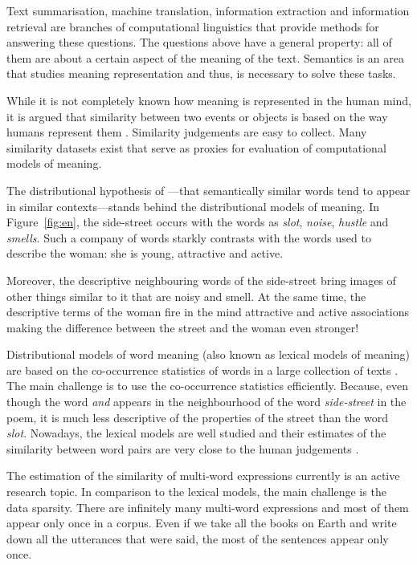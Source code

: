 Text summarisation, machine translation, information extraction and information retrieval are branches of computational linguistics that provide methods for answering these questions. The questions above have a general property: all of them are about a certain aspect of the meaning of the text. Semantics is an area that studies meaning representation and thus, is necessary to solve these tasks.

While it is not completely known how meaning is represented in the human mind, it is argued that similarity between two events or objects is based on the way humans represent them \cite{WCS:WCS1282}. Similarity judgements are easy to collect. Many similarity datasets exist that serve as proxies for evaluation of computational models of meaning.

The distributional hypothesis of \citet{harris1954distributional}---that semantically similar words tend to appear in similar contexts---stands behind the distributional models of meaning. In Figure~\ref{fig:en}, the side-street occurs with the words as \textit{slot}, \textit{noise}, \textit{hustle} and \textit{smells}. Such a company of words starkly contrasts with the words used to describe the woman: she is young, attractive and active.

Moreover, the descriptive neighbouring words of the side-street bring images of other things similar to it that are noisy and smell. At the same time, the descriptive terms of the woman fire in the mind attractive and active associations making the difference between the street and the woman even stronger!

Distributional models of word meaning (also known as lexical models of meaning) are based on the co-occurrence statistics of words in a large collection of texts \cite{Turney:2010:FMV:1861751.1861756,mikolov2013linguistic,mikolov2013distributed,mikolov2013efficient}. The main challenge is to use the co-occurrence statistics efficiently. Because, even though the word \textit{and} appears in the neighbourhood of the word \textit{side-street} in the poem, it is much less descriptive of the properties of the street than the word \textit{slot}. Nowadays, the lexical models are well studied and their estimates of the similarity between word pairs are very close to the human judgements \cite{TACL570,baroni-dinu-kruszewski:2014:P14-1,Halawi:2012:LLW:2339530.2339751}.

The estimation of the similarity of multi-word expressions currently is an active research topic. In comparison to the lexical models, the main challenge is the data sparsity. There are infinitely many multi-word expressions and most of them appear only once in a corpus. Even if we take all the books on Earth and write down all the utterances that were said, the most of the sentences appear only once.

